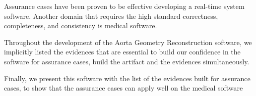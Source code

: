 
Assurance cases have been proven to be effective developing a real-time system software. Another domain that requires the high standard correctness, completeness, and consistency is medical software.

Throughout the development of the Aorta Geometry Reconstruction software, we implicitly listed the evidences that are essential to build our confidence in the software for assurance cases, build the artifact and the evidences simultaneously. 

Finally, we present this software with the list of the evidences built for assurance cases, to show that the assurance cases can apply well on the medical software
